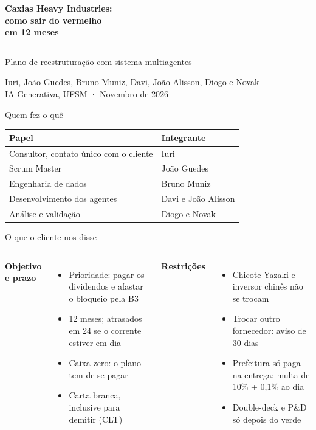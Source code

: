\documentclass[aspectratio=169,11pt]{beamer}
\begin{document}
\begin{frame}[plain]
\vspace*{18mm}
{\fontsize{22}{26}\selectfont\bfseries Caxias Heavy Industries:\\[1mm] como sair do vermelho\\ em 12 meses\par}
\vspace{4mm}\color{accent}\rule{22mm}{1.2pt}\color{ink}\par\vspace{4mm}
{\large Plano de reestruturação com sistema multiagentes}\par
\vspace{14mm}
{\small\color{muted}
Iuri, João Guedes, Bruno Muniz, Davi, João Alisson, Diogo e Novak\\ IA Generativa, UFSM \;·\; Novembro de 2026}
\end{frame}

\begin{frame}{Quem fez o quê}
\vspace{2mm}
\begin{tabular}{@{}p{}p{}@{}}
\toprule
\textbf{Papel} & \textbf{Integrante}\\
\midrule
Consultor, contato único com o cliente & Iuri
\\[2mm]
Scrum Master & João Guedes
\\[2mm]
Engenharia de dados & Bruno Muniz
\\[2mm]
Desenvolvimento dos agentes & Davi e João Alisson
\\[2mm]
Análise e validação & Diogo e Novak
\\
\bottomrule
\end{tabular}
\end{frame}

\begin{frame}{O que o cliente nos disse}
\vspace{2mm}
\begin{columns}[T]
\textbf{Objetivo e prazo}
\begin{itemize}
  \item Prioridade: pagar os dividendos e afastar o bloqueio pela B3
  \item 12 meses; atrasados em 24 se o corrente estiver em dia
  \item Caixa zero: o plano tem de se pagar
  \item Carta branca, inclusive para demitir (CLT)
\end{itemize}
\textbf{Restrições}
\begin{itemize}
  \item Chicote Yazaki e inversor chinês não se trocam
  \item Trocar outro fornecedor: aviso de 30 dias
  \item Prefeitura só paga na entrega; multa de 10\% + 0,1\% ao dia
  \item Double-deck e P\&D só depois do verde
\end{itemize}
\end{columns}
\end{frame}
\end{document}

